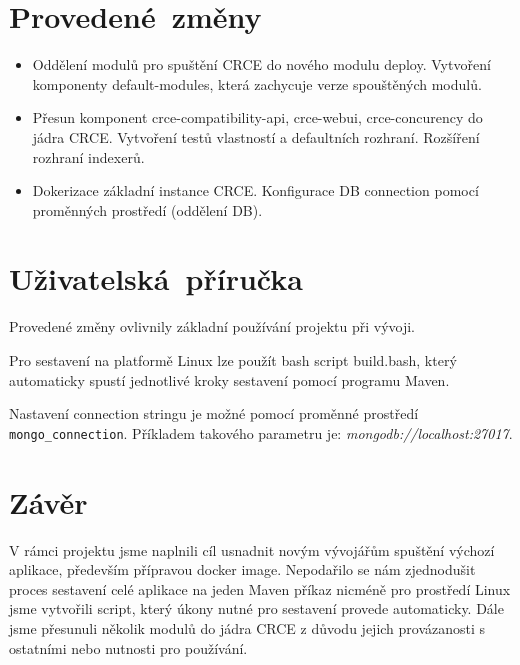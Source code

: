 \documentclass[12pt, a4paper]{article}
\begin{document}
\section{Provedené~změny} %

\begin{itemize}
	\item Oddělení modulů pro spuštění CRCE do nového modulu deploy.
		\subitem Vytvoření komponenty default-modules, která zachycuje verze spouštěných modulů.
	\item Přesun komponent crce-compatibility-api, crce-webui, crce-concurency do jádra CRCE.
		\subitem Vytvoření testů vlastností a defaultních rozhraní.
		\subitem Rozšíření rozhraní indexerů.
	\item Dokerizace základní instance CRCE.
		\subitem Konfigurace DB connection pomocí proměnných prostředí (oddělení DB).
		
\end{itemize}

\section{Uživatelská~příručka} %

Provedené změny ovlivnily základní používání projektu při vývoji. 

Pro sestavení na platformě Linux lze použít bash script build.bash, který automaticky spustí jednotlivé kroky sestavení pomocí programu Maven.

Nastavení connection stringu je možné pomocí proměnné prostředí \texttt{mongo\_connection}. Příkladem takového parametru je: \emph{mongodb://localhost:27017}.


\newpage
\section{Závěr}  %

V rámci projektu jsme naplnili cíl usnadnit novým vývojářům spuštění výchozí aplikace, především přípravou docker image. Nepodařilo se nám zjednodušit proces sestavení celé aplikace na jeden Maven příkaz nicméně pro prostředí Linux jsme vytvořili script, který úkony nutné pro sestavení provede automaticky.
Dále jsme přesunuli několik modulů do jádra CRCE z důvodu jejich provázanosti s ostatními nebo nutnosti pro používání. 
\end{document}

